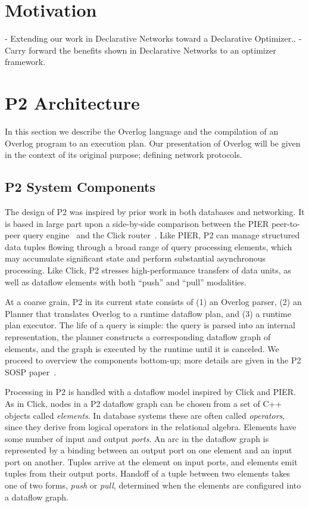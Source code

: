 \documentclass{vldb}
\begin{document}
\section{Motivation}

- Extending our work in Declarative Networks toward a Declarative Optimizer..
- Carry forward the benefits shown in Declarative Networks to an optimizer 
framework.

\section{P2 Architecture}

In this section we describe the Overlog language and the compilation
of an Overlog program to an execution plan. Our presentation of Overlog
will be given in the context of its original purpose; defining network protocols.

\subsection{P2 System Components}
The design of P2 was inspired by prior work in both databases and
networking. It is based in large part upon a
side-by-side comparison between the PIER peer-to-peer query
engine~\cite{pier-cidr05} and the Click router~\cite{click-tocs}. Like
PIER, P2 can manage structured data tuples flowing through a broad
range of query processing elements, which may accumulate significant
state and perform substantial asynchronous processing.  Like Click, P2
stresses high-performance transfers of data units, as well as dataflow
elements with both ``push'' and ``pull'' modalities. 

At a coarse grain, P2 in its current state consists of (1) an Overlog
parser, (2) an Planner that translates Overlog to a runtime dataflow
plan, and (3) a runtime plan executor.  The
life of a query is simple: the query is parsed into an internal
representation, the planner constructs a corresponding dataflow graph
of elements, and the graph is executed by the runtime until it is
canceled.  We proceed to overview the components bottom-up; more
details are given in the P2 SOSP paper~\cite{loo-sosp05}.

Processing in P2 is handled with a dataflow model inspired by Click
and PIER.  As in Click, nodes in a P2 dataflow
graph can be chosen from a set of C++ objects called
\textit{elements}.  In database systems these are often called
\textit{operators}, since they derive from logical operators in the
relational algebra.  Elements have some number of input and output
\emph{ports}.  An arc in the dataflow graph is represented by a
binding between an output port on one element and an input port on
another.  Tuples arrive at the element on input ports, and elements
emit tuples from their output ports. Handoff of a tuple between two elements takes one
of two forms, \emph{push} or \emph{pull}, determined when the elements
are configured into a dataflow graph.   
\end{document}
